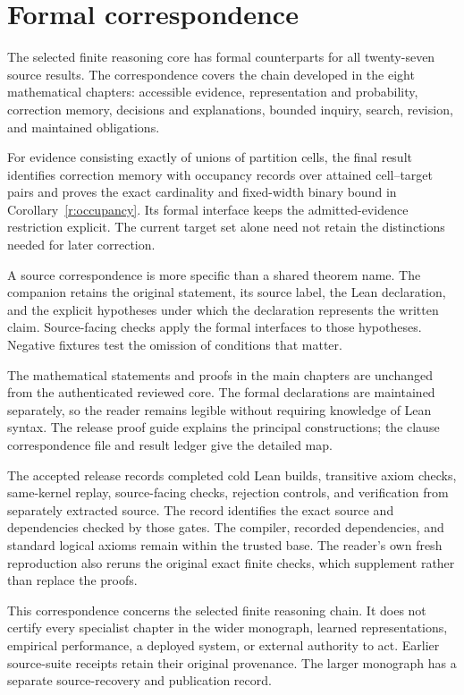 \chapter{Formal correspondence}
The selected finite reasoning core has formal counterparts for all twenty-seven source results. The correspondence covers the chain developed in the eight mathematical chapters: accessible evidence, representation and probability, correction memory, decisions and explanations, bounded inquiry, search, revision, and maintained obligations.

For evidence consisting exactly of unions of partition cells, the final result identifies correction memory with occupancy records over attained cell--target pairs and proves the exact cardinality and fixed-width binary bound in Corollary~\ref{r:occupancy}. Its formal interface keeps the admitted-evidence restriction explicit. The current target set alone need not retain the distinctions needed for later correction.

A source correspondence is more specific than a shared theorem name. The companion retains the original statement, its source label, the Lean declaration, and the explicit hypotheses under which the declaration represents the written claim. Source-facing checks apply the formal interfaces to those hypotheses. Negative fixtures test the omission of conditions that matter.

The mathematical statements and proofs in the main chapters are unchanged from the authenticated reviewed core. The formal declarations are maintained separately, so the reader remains legible without requiring knowledge of Lean syntax. The release proof guide explains the principal constructions; the clause correspondence file and result ledger give the detailed map.

The accepted release records completed cold Lean builds, transitive axiom checks, same-kernel replay, source-facing checks, rejection controls, and verification from separately extracted source. The record identifies the exact source and dependencies checked by those gates. The compiler, recorded dependencies, and standard logical axioms remain within the trusted base. The reader's own fresh reproduction also reruns the original exact finite checks, which supplement rather than replace the proofs.

This correspondence concerns the selected finite reasoning chain. It does not certify every specialist chapter in the wider monograph, learned representations, empirical performance, a deployed system, or external authority to act. Earlier source-suite receipts retain their original provenance. The larger monograph has a separate source-recovery and publication record.

